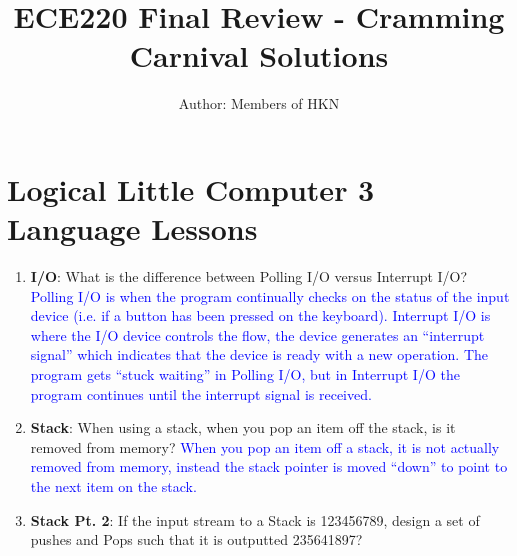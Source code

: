 \documentclass{article}
\title{ECE220 Final Review - Cramming Carnival Solutions}
\author{Author: Members of HKN}
\date{}
\begin{document}
\maketitle

\section{
Logical Little Computer 3 Language Lessons}
\begin{enumerate}[label=(\alph*)]
    \item \textbf{I/O}: What is the difference between Polling I/O versus Interrupt I/O?
    \newline\textcolor{blue}{
    Polling I/O is when the program continually checks on the status of the input device (i.e. if a button has been pressed on the keyboard). Interrupt I/O is where the I/O device controls the flow, the device generates an “interrupt signal” which indicates that the device is ready with a new operation. The program gets “stuck waiting” in Polling I/O, but in Interrupt I/O the program continues until the interrupt signal is received.}

    \item \textbf{Stack}: When using a stack, when you pop an item off the stack, is it removed from memory?
    \newline\textcolor{blue}{When you pop an item off a stack, it is not actually removed from memory, instead the stack pointer is moved “down” to point to the next item on the stack.}
    
    \item \textbf{Stack Pt. 2}: If the input stream to a Stack is 123456789, design a set of pushes and Pops such that it is outputted 235641897?


\end{enumerate}
\end{document}
